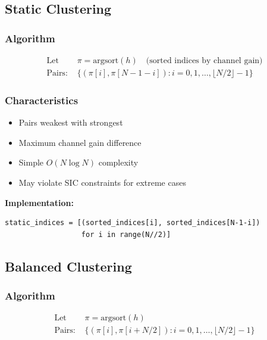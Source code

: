 \documentclass[12pt,a4paper]{article}
\begin{document}
\subsection{Static Clustering}

\subsubsection{Algorithm}

\begin{align}
\text{Let } &\pi = \text{argsort}(h) \quad \text{(sorted indices by channel gain)} \\
\text{Pairs: } &\{(\pi[i], \pi[N-1-i]) : i = 0, 1, \ldots, \lfloor N/2 \rfloor - 1\}
\end{align}

\subsubsection{Characteristics}

\begin{itemize}
    \item Pairs weakest with strongest
    \item Maximum channel gain difference
    \item Simple $O(N \log N)$ complexity
    \item May violate SIC constraints for extreme cases
\end{itemize}

\textbf{Implementation:}
\begin{lstlisting}[caption={Static Clustering}]
static_indices = [(sorted_indices[i], sorted_indices[N-1-i]) 
                  for i in range(N//2)]
\end{lstlisting}

\subsection{Balanced Clustering}

\subsubsection{Algorithm}

\begin{align}
\text{Let } &\pi = \text{argsort}(h) \\
\text{Pairs: } &\{(\pi[i], \pi[i + N/2]) : i = 0, 1, \ldots, \lfloor N/2 \rfloor - 1\}
\end{align}
\end{document}

